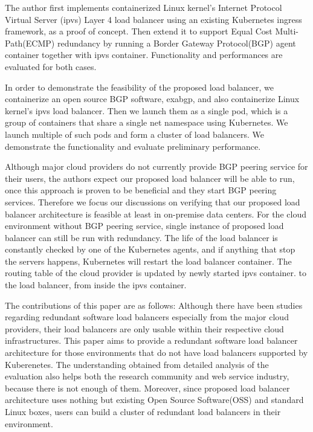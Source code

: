 The author first implements containerized Linux kernel's Internet Protocol Virtual Server (ipvs)\cite{Zhang2000} Layer 4 load balancer using an existing Kubernetes ingress\cite{K8sIngress2017} framework, as a proof of concept.
Then extend it to support Equal Cost Multi-Path(ECMP)\cite{thaler2000multipath} redundancy by running a Border Gateway Protocol(BGP) agent container together with ipvs container.
Functionality and performances are evaluated for both cases.

In order to demonstrate the feasibility of the proposed load balancer, we containerize an open source BGP software, exabgp\cite{exa-networks_2018}, and also containerize Linux kernel's ipvs load balancer. Then we launch them as a single pod, which is a group of containers that share a single net namespace using Kubernetes. We launch multiple of such pods and form a cluster of load balancers.
We demonstrate the functionality and evaluate preliminary performance.

Although major cloud providers do not currently provide BGP peering service for their users, the authors expect our proposed load balancer will be able to run, once this approach is proven to be beneficial and they start BGP peering services.
Therefore we focus our discussions on verifying that our proposed load balancer architecture is feasible at least in on-premise data centers.
For the cloud environment without BGP peering service, single instance of proposed load balancer can still be run with redundancy.
The life of the load balancer is constantly checked by one of the Kubernetes agents, and if anything that stop the servers happens, Kubernetes will restart the load balancer container. 
The routing table of the cloud provider is updated by newly started ipvs container.
to the load balancer, from inside the ipvs container.

The contributions of this paper are as follows:
Although there have been studies regarding redundant software load balancers especially from the major cloud providers\cite{eisenbud2016maglev,patel2013ananta}, their load balancers are only usable within their respective cloud infrastructures.
This paper aims to provide a redundant software load balancer architecture for those environments that do not have load balancers supported by Kuberenetes.
The understanding obtained from detailed analysis of the evaluation also helps both the research community and web service industry, because there is not enough of them.
Moreover, since proposed load balancer architecture uses nothing but existing Open Source Software(OSS) and standard Linux boxes, users can build a cluster of redundant load balancers in their environment.

